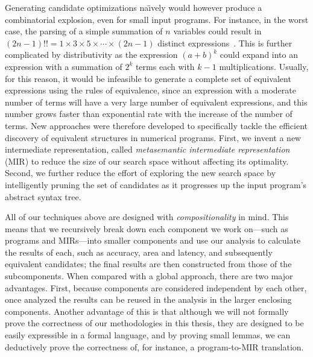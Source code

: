 Generating candidate optimizations na{\"\i}vely would however produce a
combinatorial explosion, even for small input programs.  For instance, in
the worst case, the parsing of a simple summation of $n$ variables could
result in $(2n - 1)!! = 1\times3\times5\times\cdots\times(2n - 1)$ distinct
expressions~\cite{ioualalen, mouilleron}.  This is further complicated
by distributivity as the expression ${(a + b)}^k$ could expand into an
expression with a summation of $2^k$ terms each with $k - 1$ multiplications.
Usually, for this reason, it would be infeasible to generate a complete set
of equivalent expressions using the rules of equivalence, since an expression
with a moderate number of terms will have a very large number of equivalent
expressions, and this number grows faster than exponential rate with the
increase of the number of terms.  New approaches were therefore developed
to specifically tackle the efficient discovery of equivalent structures in
numerical programs.  First, we invent a new intermediate representation, called
\emph{metasemantic intermediate representation} (MIR) to reduce the size of our
search space without affecting its optimality.  Second, we further reduce the
effort of exploring the new search space by intelligently pruning the set of
candidates as it progresses up the input program's abstract syntax tree.

All of our techniques above are designed with \emph{compositionality} in mind.
This means that we recursively break down each component we work on---such as
programs and MIRs---into smaller components and use our analysis to calculate
the results of each, such as accuracy, area and latency, and subsequently
equivalent candidates; the final results are then constructed from those of
the subcomponents.  When compared with a global approach, there are two major
advantages.  First, because components are considered independent by each
other, once analyzed the results can be reused in the analysis in the larger
enclosing components.  Another advantage of this is that although we will
not formally prove the correctness of our methodologies in this thesis, they
are designed to be easily expressible in a formal language, and by proving
small lemmas, we can deductively prove the correctness of, for instance, a
program-to-MIR translation.
